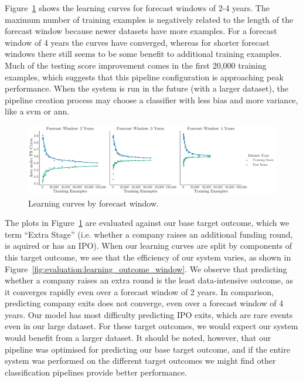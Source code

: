 \documentclass[../thesis/thesis.tex]{subfiles}
\begin{document}
Figure~\ref{fig:evaluation:learning_window} shows the learning curves for forecast windows of 2-4 years. The maximum number of training examples is negatively related to the length of the forecast window because newer datasets have more examples. For a forecast window of 4 years the curves have converged, whereas for shorter forecast windows there still seems to be some benefit to additional training examples. Much of the testing score improvement comes in the first 20,000 training examples, which suggests that this pipeline configuration is approaching peak performance. When the system is run in the future (with a larger dataset), the pipeline creation process may choose a classifier with less bias and more variance, like a \gls{svm} or \gls{ann}.

\begin{figure}[!htb]
    \centering
    \includegraphics[width=\textwidth]{../figures/evaluation/learning_curves_window}
    \caption[Learning curves by forecast window]{Learning curves by forecast window.}
    \label{fig:evaluation:learning_window}
\end{figure}

The plots in Figure~\ref{fig:evaluation:learning_window} are evaluated against our base target outcome, which we term ``Extra Stage'' (i.e. whether a company raises an additional funding round, is aquired or has an IPO). When our learning curves are split by components of this target outcome, we see that the efficiency of our system varies, as shown in Figure~\ref{fig:evaluation:learning_outcome_window}. We observe that predicting whether a company raises an extra round is the least data-intensive outcome, as it converges rapidly even over a forecast window of 2 years. In comparison, predicting company exits does not converge, even over a forecast window of 4 years. Our model has most difficulty predicting IPO exits, which are rare events even in our large dataset. For these target outcomes, we would expect our system would benefit from a larger dataset. It should be noted, however, that our pipeline was optimised for predicting our base target outcome, and if the entire system was performed on the different target outcomes we might find other classification pipelines provide better performance.
\end{document}
